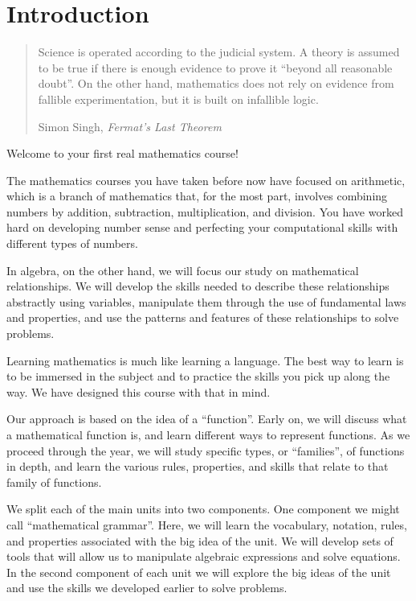 \chapter*{Introduction}
\label{ch:intro}

\begin{quote}
Science is operated according to the judicial system. A theory is assumed to be true if there is enough evidence to prove it ``beyond all reasonable doubt''.
On the other hand, mathematics does not rely on evidence from fallible experimentation, but it is built on infallible logic.

\hfill Simon Singh, {\em Fermat's Last Theorem}
\end{quote}

\bigskip

Welcome to your first real mathematics course!

The mathematics courses you have taken before now have focused on arithmetic, which is a branch of mathematics that, for the most part, involves combining numbers by addition, subtraction, multiplication, and division. You have worked hard on developing number sense and perfecting your computational skills with different types of numbers.

In algebra, on the other hand, we will focus our study on mathematical relationships. We will develop the skills needed to describe these relationships abstractly using variables, manipulate them through the use of fundamental laws and properties, and use the patterns and features of these relationships to solve problems.

Learning mathematics is much like learning a language. The best way to learn is to be immersed in the subject and to practice the skills you pick up along the way. We have designed this course with that in mind.

Our approach is based on the idea of a ``function''. Early on, we will discuss what a mathematical function is, and learn different ways to represent functions. As we proceed through the year, we will study specific types, or ``families'', of functions in depth, and learn the various rules, properties, and skills that relate to that family of functions.

We split each of the main units into two components. One component we might call ``mathematical grammar''. Here, we will learn the vocabulary, notation, rules, and properties associated with the big idea of the unit. We will develop sets of tools that will allow us to manipulate algebraic expressions and solve equations. In the second component of each unit we will explore the big ideas of the unit and use the skills we developed earlier to solve problems.

